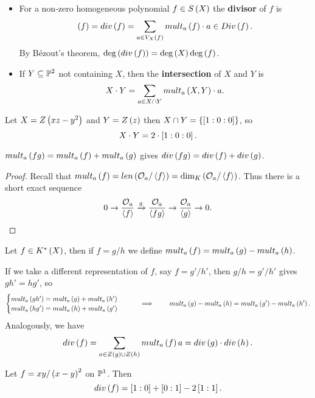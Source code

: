 \pagebreak

\begin{definition}
\hfill
\begin{itemize}
\item For a non-zero homogeneous polynomial $ f \in S\rb{X} $ the \textbf{divisor} of $ f $ is
$$ \rb{f} = div\rb{f} = \sum_{a \in V_X\rb{f}} mult_a\rb{f} \cdot a \in Div\rb{f}. $$
By B\'ezout's theorem, $ \deg\rb{div\rb{f}} = \deg\rb{X}\deg\rb{f} $.
\item If $ Y \subseteq \P^2 $ not containing $ X $, then the \textbf{intersection} of $ X $ and $ Y $ is
$$ X \cdot Y = \sum_{a \in X \cap Y} mult_a\rb{X, Y} \cdot a. $$
\end{itemize}
\end{definition}

\begin{example}
Let $ X = Z\rb{xz - y^2} $ and $ Y = Z\rb{z} $ then $ X \cap Y = \cb{\sb{1 : 0 : 0}} $, so
$$ X \cdot Y = 2 \cdot \sb{1 : 0 : 0}. $$
\end{example}

\begin{lemma}
$ mult_a\rb{fg} = mult_a\rb{f} + mult_a\rb{g} $ gives $ div\rb{fg} = div\rb{f} + div\rb{g} $.
\end{lemma}

\begin{proof}
Recall that $ mult_a\rb{f} = len\rb{\OO_a / \ab{f}} = \dim_K\rb{\OO_a / \ab{f}} $. Thus there is a short exact sequence
$$ 0 \to \dfrac{\OO_a}{\ab{f}} \xrightarrow{g} \dfrac{\OO_a}{\ab{fg}} \to \dfrac{\OO_a}{\ab{g}} \to 0. $$
\end{proof}

\begin{definition}
Let $ f \in K^*\rb{X} $, then if $ f = g / h $ we define $ mult_a\rb{f} = mult_a\rb{g} - mult_a\rb{h} $.
\end{definition}

If we take a different representation of $ f $, say $ f = g' / h' $, then $ g / h = g' / h' $ gives $ gh' = hg' $, so
$$
\begin{cases}
mult_a\rb{gh'} = mult_a\rb{g} + mult_a\rb{h'} \\
mult_a\rb{hg'} = mult_a\rb{h} + mult_a\rb{g'}
\end{cases}
\qquad \implies \qquad mult_a\rb{g} - mult_a\rb{h} = mult_a\rb{g'} - mult_a\rb{h'}. $$
Analogously, we have
$$ div\rb{f} = \sum_{a \in Z\rb{g} \cup Z\rb{h}} mult_a\rb{f}a = div\rb{g} \cdot div\rb{h}. $$

\begin{example}
Let $ f = xy / \rb{x - y}^2 $ on $ \P^1 $. Then
$$ div\rb{f} = \sb{1 : 0} + \sb{0 : 1} - 2\sb{1 : 1}. $$
\end{example}


